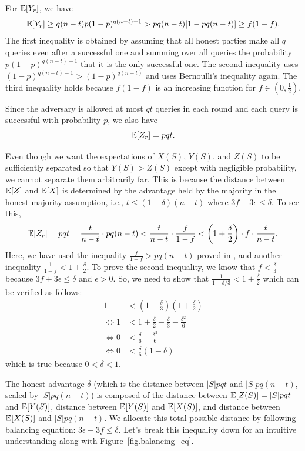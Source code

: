 For $\mathbb{E}[Y_r]$, we have
\begin{align}
\label{eq.y_lower_bound}
    \mathbb{E}[Y_r]  \geq q(n-t)p (1-p)^{q(n-t)-1} > pq(n-t)[1-pq(n-t)] \geq f (1-f).
\end{align}
The first inequality is obtained by assuming that all honest parties make all $q$ queries even after a successful one and summing over all queries the probability $p(1-p)^{q(n-t)-1}$ that it is the only successful one.
The second inequality uses $(1-p)^{q(n-t)-1} > (1-p)^{q(n-t)}$ and uses Bernoulli's inequality again.
The third inequality holds because $f(1-f)$ is an increasing function for $f \in (0,\frac12)$.

Since the adversary is allowed at most $qt$ queries in each round and each query is successful with probability $p$, we also have
\begin{align}
    \mathbb{E}[Z_r] = pqt.
\end{align}

Even though we want the expectations of $X(S)$, $Y(S)$, and $Z(S)$ to be sufficiently separated so that $Y(S) > Z(S)$ except with negligible probability, we cannot separate them arbitrarily far. This is because the distance between $\mathbb{E}[Z]$ and $\mathbb{E}[X]$ is determined by the advantage held by the majority in the honest majority assumption, i.e., $t \leq (1-\delta)(n-t)$ where $3f+3\epsilon \leq \delta$.
To see this,
\begin{align}
    \mathbb{E}[Z_r] = pqt = \frac{t}{n-t} \cdot pq(n-t) < \frac{t}{n-t} \cdot \frac{f}{1-f} < \left(1+\frac{\delta}{2}\right)\cdot f \cdot \frac{t}{n-t}.
\end{align}
Here, we have used the inequality $\frac{f}{1-f} > pq(n-t)$ proved in , and another inequality $\frac{1}{1-f} < 1 + \frac{\delta}{2}$. To prove the second inequality, we know that $f < \frac{\delta}{3}$ because $3f+3\epsilon \leq \delta$ and $\epsilon>0$. So, we need to show that $\frac{1}{1-\delta/3} < 1+\frac{\delta}{2}$ which can be verified as follows:
\begin{align*}
    1 &< \left(1-\frac{\delta}{3}\right) \left(1+\frac{\delta}{2}\right) \\
    \iff 1 &< 1 + \frac{\delta}{2} - \frac{\delta}{3} - \frac{\delta^2}{6} \\
    \iff 0 &< \frac{\delta}{6} - \frac{\delta^2}{6} \\
    \iff 0 &< \frac{\delta}{6}(1-\delta)
\end{align*}
which is true because $0 < \delta < 1$.

The honest advantage $\delta$ (which is the distance between $|S|pqt$ and $|S|pq(n-t)$, scaled by $|S|pq(n-t)$) is composed of the distance between $\mathbb{E}[Z(S)]=|S|pqt$ and $\mathbb{E}[Y(S)]$, distance between $\mathbb{E}[Y(S)]$ and $\mathbb{E}[X(S)]$, and distance between $\mathbb{E}[X(S)]$ and $|S|pq(n-t)$. We allocate this total possible distance by following balancing equation: $3\epsilon + 3f \leq \delta$. Let's break this inequality down for an intuitive understanding along with Figure~\ref{fig.balancing_eq}.

